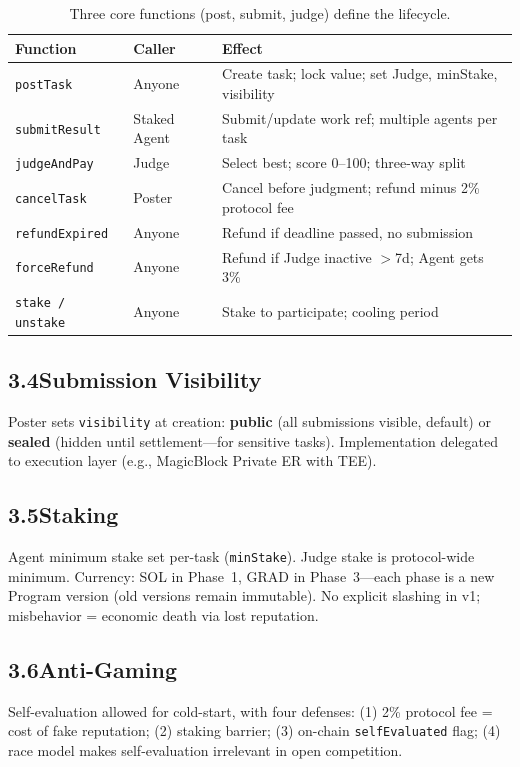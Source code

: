 \documentclass[11pt,a4paper]{article}
\begin{document}
\begin{table}[H]\centering\small
\begin{tabular}{@{}llp{5.6cm}@{}}
\toprule
\textbf{Function} & \textbf{Caller} & \textbf{Effect} \\
\midrule
\texttt{postTask} & Anyone & Create task; lock value; set Judge, minStake, visibility \\
\texttt{submitResult} & Staked Agent & Submit/update work ref; multiple agents per task \\
\texttt{judgeAndPay} & Judge & Select best; score 0--100; three-way split \\
\texttt{cancelTask} & Poster & Cancel before judgment; refund minus 2\% protocol fee \\
\texttt{refundExpired} & Anyone & Refund if deadline passed, no submission \\
\texttt{forceRefund} & Anyone & Refund if Judge inactive $>$7d; Agent gets 3\% \\
\texttt{stake / unstake} & Anyone & Stake to participate; cooling period \\
\bottomrule
\end{tabular}
\caption{Three core functions (post, submit, judge) define the lifecycle.}
\end{table}

\subsection{3.4\quad Submission Visibility}
Poster sets \texttt{visibility} at creation: \textbf{public} (all submissions visible, default) or \textbf{sealed} (hidden until settlement---for sensitive tasks). Implementation delegated to execution layer (e.g., MagicBlock Private ER with TEE).

\subsection{3.5\quad Staking}
Agent minimum stake set per-task (\texttt{minStake}). Judge stake is protocol-wide minimum. Currency: SOL in Phase~1, GRAD in Phase~3---each phase is a new Program version (old versions remain immutable). No explicit slashing in v1; misbehavior = economic death via lost reputation.

\subsection{3.6\quad Anti-Gaming}
Self-evaluation allowed for cold-start, with four defenses: (1) 2\% protocol fee = cost of fake reputation; (2) staking barrier; (3) on-chain \texttt{selfEvaluated} flag; (4) race model makes self-evaluation irrelevant in open competition.
\end{document}
